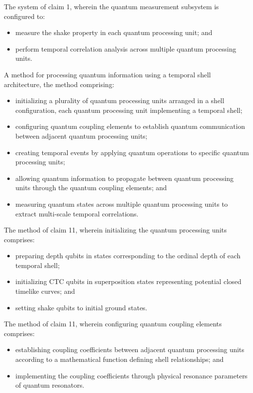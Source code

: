\documentclass[12pt,letterpaper]{article}
\begin{document}
\begin{patentclaims}
    \item The system of claim 1, wherein the quantum measurement subsystem is configured to:
    \begin{itemize}[leftmargin=2em]
        \item measure the shake property in each quantum processing unit; and
        \item perform temporal correlation analysis across multiple quantum processing units.
    \end{itemize}
    
    \item A method for processing quantum information using a temporal shell architecture, the method comprising:
    \begin{itemize}[leftmargin=2em]
        \item initializing a plurality of quantum processing units arranged in a shell configuration, each quantum processing unit implementing a temporal shell;
        \item configuring quantum coupling elements to establish quantum communication between adjacent quantum processing units;
        \item creating temporal events by applying quantum operations to specific quantum processing units;
        \item allowing quantum information to propagate between quantum processing units through the quantum coupling elements; and
        \item measuring quantum states across multiple quantum processing units to extract multi-scale temporal correlations.
    \end{itemize}
    
    \item The method of claim 11, wherein initializing the quantum processing units comprises:
    \begin{itemize}[leftmargin=2em]
        \item preparing depth qubits in states corresponding to the ordinal depth of each temporal shell;
        \item initializing CTC qubits in superposition states representing potential closed timelike curves; and
        \item setting shake qubits to initial ground states.
    \end{itemize}
    
    \item The method of claim 11, wherein configuring quantum coupling elements comprises:
    \begin{itemize}[leftmargin=2em]
        \item establishing coupling coefficients between adjacent quantum processing units according to a mathematical function defining shell relationships; and
        \item implementing the coupling coefficients through physical resonance parameters of quantum resonators.
    \end{itemize}
    

\end{patentclaims}
\end{document}
